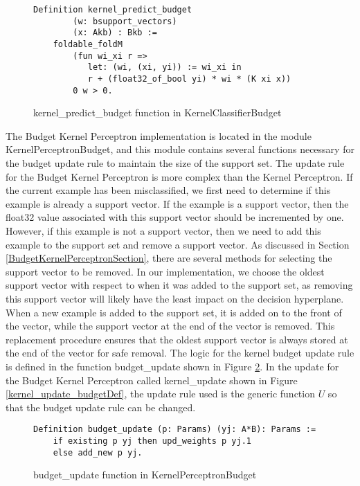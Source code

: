 \begin{figure}
    \caption{kernel\_predict\_budget function in KernelClassifierBudget}
    \label{kernel_predict_budgetDef}
    \begin{lstlisting}
Definition kernel_predict_budget
        (w: bsupport_vectors)
        (x: Akb) : Bkb :=
    foldable_foldM
        (fun wi_xi r =>
           let: (wi, (xi, yi)) := wi_xi in 
           r + (float32_of_bool yi) * wi * (K xi x))
        0 w > 0.
    \end{lstlisting}
\end{figure}

The Budget Kernel Perceptron implementation is located in the module KernelPerceptronBudget, and this module contains several functions necessary for the budget update rule to maintain the size of the support set. The update rule for the Budget Kernel Perceptron is more complex than the Kernel Perceptron. If the current example has been misclassified, we first need to determine if this example is already a support vector. If the example is a support vector, then the float32 value associated with this support vector should be incremented by one. However, if this example is not a support vector, then we need to add this example to the support set and remove a support vector. As discussed in Section \ref{BudgetKernelPerceptronSection}, there are several methods for selecting the support vector to be removed. In our implementation, we choose the oldest support vector with respect to when it was added to the support set, as removing this support vector will likely have the least impact on the decision hyperplane. When a new example is added to the support set, it is added on to the front of the vector, while the support vector at the end of the vector is removed. This replacement procedure ensures that the oldest support vector is always stored at the end of the vector for safe removal. The logic for the kernel budget update rule is defined in the function budget\_update shown in Figure \ref{budget_updateDef}. In the update for the Budget Kernel Perceptron called kernel\_update shown in Figure \ref{kernel_update_budgetDef}, the update rule used is the generic function $U$ so that the budget update rule can be changed. 

\begin{figure}
    \caption{budget\_update function in KernelPerceptronBudget}
    \label{budget_updateDef}
    \begin{lstlisting}
Definition budget_update (p: Params) (yj: A*B): Params :=
    if existing p yj then upd_weights p yj.1
    else add_new p yj.
    \end{lstlisting}
\end{figure}


